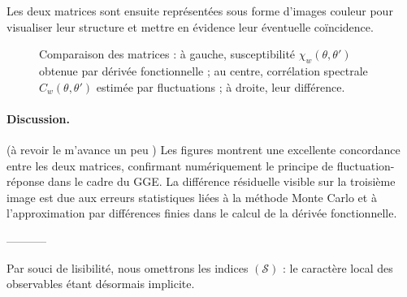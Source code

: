 Les deux matrices sont ensuite représentées sous forme d'images couleur pour visualiser leur structure et mettre en évidence leur éventuelle coïncidence.

\begin{figure}[H]
    \centering
    \caption{Comparaison des matrices : à gauche, susceptibilité \( \chi_w(\theta,\theta') \) obtenue par dérivée fonctionnelle ; au centre, corrélation spectrale \( C_w(\theta,\theta') \) estimée par fluctuations ; à droite, leur différence.}
    \label{fig:comparison_chi_C}
\end{figure}

\paragraph{Discussion.}

{\color{blue} { (\color{red}à revoir le m'avance un peu )} Les figures montrent une excellente concordance entre les deux matrices, confirmant numériquement le principe de fluctuation-réponse dans le cadre du GGE. La différence résiduelle visible sur la troisième image est due aux erreurs statistiques liées à la méthode Monte Carlo et à l’approximation par différences finies dans le calcul de la dérivée fonctionnelle.} 

-----------

Par souci de lisibilité, nous omettrons les indices \((\mathcal{S})\) : le caractère local des observables étant désormais implicite.\\

